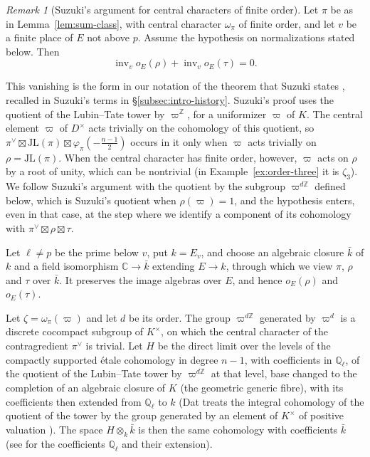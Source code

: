 \documentclass[a4paper,11pt]{amsart}
\theoremstyle{definition}
\theoremstyle{remark}
\newtheorem{remark}[theorem]{Remark}
\numberwithin{equation}{section}
\newcommand{\Q}{\mathbb{Q}}
\newcommand{\Z}{\mathbb{Z}}
\DeclareMathOperator{\inv}{inv}
\newcommand{\C}{\mathbb{C}}
\newcommand{\JL}{\mathrm{JL}}
\begin{document}
\begin{remark}[Suzuki's argument for central characters of finite order]
\label{rem:suzuki-step}
Let $\pi$ be as in Lemma~\ref{lem:sum-class}, with central character $\omega_\pi$ of finite order, and let $v$ be a finite place of $E$ not above $p$. Assume the hypothesis on normalizations stated below. Then
\[
 \inv_vo_E(\rho)+\inv_vo_E(\tau)=0.
\]

This vanishing is the form in our notation of the theorem that Suzuki  states \cite[Theorem~4.0.5]{Su23}, recalled in Suzuki's terms in \S\ref{subsec:intro-history}. Suzuki's proof uses the quotient of the Lubin--Tate tower by $\varpi^{\Z}$, for a uniformizer $\varpi$ of $K$. The central element $\varpi$ of $D^\times$ acts trivially on the cohomology of this quotient, so $\pi^\vee\boxtimes\JL(\pi)\boxtimes\varphi_\pi(-\frac{n-1}2)$ occurs in it only when $\varpi$ acts trivially on $\rho=\JL(\pi)$. When the central character has finite order, however, $\varpi$ acts on $\rho$ by a root of unity, which can be nontrivial (in Example~\ref{ex:order-three} it is $\zeta_3$). We follow Suzuki's argument with the quotient by the subgroup $\varpi^{d\Z}$ defined below, which is Suzuki's quotient when $\rho(\varpi)=1$, and the hypothesis enters, even in that case, at the step where we identify a component of its cohomology with $\pi^\vee\boxtimes\rho\boxtimes\tau$.

Let $\ell\neq p$ be the prime below $v$, put $k=E_v$, and choose an algebraic closure $\bar k$ of $k$ and a field isomorphism $\C\to\bar k$ extending $E\to k$, through which we view $\pi$, $\rho$ and $\tau$ over $\bar k$. It preserves the image algebras over $E$, and hence $o_E(\rho)$ and $o_E(\tau)$.

Let $\zeta=\omega_\pi(\varpi)$ and let $d$ be its order. The group $\varpi^{d\Z}$ generated by $\varpi^d$ is a discrete cocompact subgroup of $K^\times$, on which the central character of the contragredient $\pi^\vee$ is trivial. Let $H$ be the direct limit over the levels of the compactly supported \'etale cohomology in degree $n-1$, with coefficients in $\Q_\ell$, of the quotient of the Lubin--Tate tower by $\varpi^{d\Z}$ at that level, base changed to the completion of an algebraic closure of $K$ (the geometric generic fibre), with its coefficients then extended from $\Q_\ell$ to $k$ (Dat treats the integral cohomology of the quotient of the tower by the group generated by an element of $K^\times$ of positive valuation \cite[\S1.2]{Dat12}). The space $H\otimes_k\bar k$ is then the same cohomology with coefficients $\bar k$ (see \cite[\S2.5]{Str08} for the coefficients $\Q_\ell$ and their extension).


\end{remark}
\end{document}
